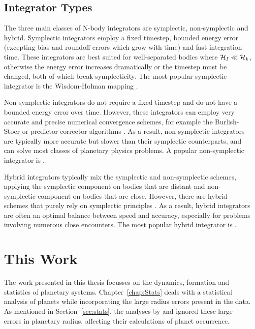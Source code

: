 \subsection{Integrator Types}
\label{sec:inttypes}
The three main classes of N-body integrators are symplectic, non-symplectic and hybrid. 
Symplectic integrators employ a fixed timestep, bounded energy error (excepting bias and roundoff errors which grow with time) and fast integration time.
These integrators are best suited for well-separated bodies where $\mathcal{H}_I \ll \mathcal{H}_k$, otherwise the energy error increases dramatically or the timestep must be changed, both of which break symplecticity. 
The most popular symplectic integrator is the Wisdom-Holman mapping \citep{Wisdom1991}.

Non-symplectic integrators do not require a fixed timestep and do not have a bounded energy error over time. 
However, these integrators can employ very accurate and precise numerical convergence schemes, for example the Burlish-Stoer or predictor-corrector algorithms \citep{Press2002}.
As a result, non-symplectic integrators are typically more accurate but slower than their symplectic counterparts, and can solve most classes of planetary physics problems. 
A popular non-symplectic integrator is \ias \citep{Rein2015a}.

Hybrid integrators typically mix the symplectic and non-symplectic schemes, applying the symplectic component on bodies that are distant and non-symplectic component on bodies that are close. 
However, there are hybrid schemes that purely rely on symplectic principles \citep[e.g.][]{Duncan1998}.
As a result, hybrid integrators are often an optimal balance between speed and accuracy, especially for problems involving numerous close encounters. 
The most popular hybrid integrator is \mercury \citep{Chambers1999}.

\section{This Work}
The work presented in this thesis focusses on the dynamics, formation and statistics of planetary systems. 
Chapter~\ref{chap:Stats} deals with a statistical analysis of \kep planets while incorporating the large radius errors present in the \kep data. 
As mentioned in Section~\ref{sec:stats}, the analyses by \citet{Fressin2013} and \citet{Petigura2013} ignored these large errors in planetary radius, affecting their calculations of planet occurrence.

